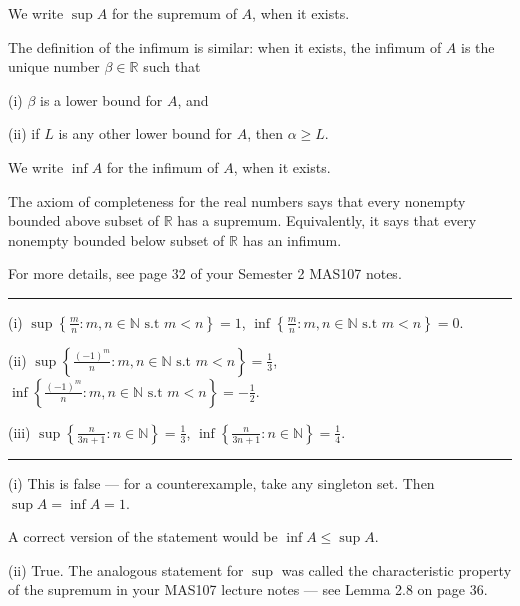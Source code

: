 \documentclass[letterpaper,10pt,english]{jupyterBook}
\begin{document}
\sphinxAtStartPar
We write \(\sup A\) for the supremum of \(A\), when it exists.

\sphinxAtStartPar
The definition of the infimum is similar: when it exists, the infimum of \(A\) is the unique number \(\beta\in\mathbb{R}\) such that

\sphinxAtStartPar
(i) \(\beta\) is a lower bound for \(A\), and

\sphinxAtStartPar
(ii) if \(L\) is any other lower bound for \(A\), then \(\alpha\geq L\).

\sphinxAtStartPar
We write \(\inf A\) for the infimum of \(A\), when it exists.

\sphinxAtStartPar
The axiom of completeness for the real numbers says that every non\sphinxhyphen{}empty bounded above subset of \(\mathbb{R}\) has a supremum. Equivalently, it says that every non\sphinxhyphen{}empty bounded below subset of \(\mathbb{R}\) has an infimum.

\sphinxAtStartPar
For more details, see page 32 of your Semester 2 MAS107 notes.


\bigskip\hrule\bigskip


\sphinxAtStartPar
{\hyperref[\detokenize{Problems:p6}]{}}(i) \(\displaystyle\sup\left\{\frac{m}{n}:m,n\in\mathbb{N} \text{ s.t } m<n\right\}=1\), \(\displaystyle\inf\left\{\frac{m}{n}:m,n\in\mathbb{N} \text{ s.t } m<n\right\}=0\).

\sphinxAtStartPar
(ii) \(\displaystyle\sup\left\{\frac{(-1)^m}{n}:m,n\in\mathbb{N} \text{ s.t } m<n\right\}=\frac{1}{3}\), \(\displaystyle\inf\left\{\frac{(-1)^m}{n}:m,n\in\mathbb{N} \text{ s.t } m<n\right\}=-\frac{1}{2}\).

\sphinxAtStartPar
(iii) \(\displaystyle\sup\left\{\frac{n}{3n + 1} :n\in\mathbb{N}\right\}=\frac{1}{3}\), \(\displaystyle\inf\left\{\frac{n}{3n + 1} :n\in\mathbb{N}\right\}=\frac{1}{4}\).


\bigskip\hrule\bigskip


\sphinxAtStartPar
{\hyperref[\detokenize{Problems:p7}]{}}(i) This is false — for a counter\sphinxhyphen{}example, take any singleton set. Then \(\sup A=\inf A=1\).

\sphinxAtStartPar
A correct version of the statement would be \(\inf A \leq \sup A\).

\sphinxAtStartPar
(ii) True. The analogous statement for \(\sup\) was called the characteristic property of the supremum in your MAS107 lecture notes — see Lemma 2.8 on page 36.
\end{document}
